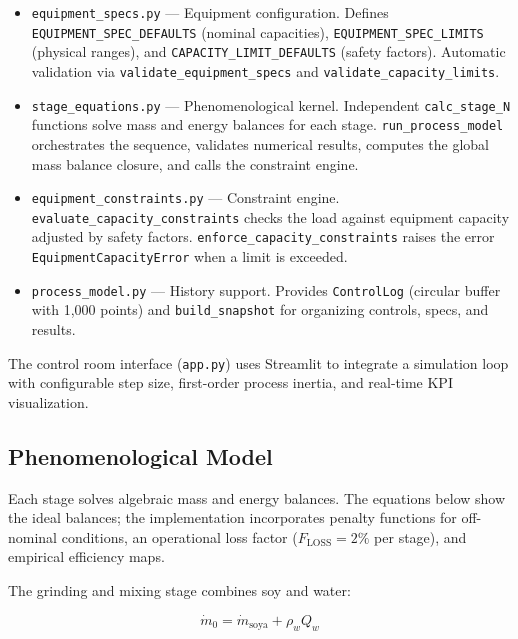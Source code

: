 \documentclass[10pt]{article}
\begin{document}
\begin{itemize}
    \item \texttt{equipment\_}\allowbreak\texttt{specs.py} --- Equipment configuration. Defines \texttt{EQUIPMENT\_SPEC\_}\allowbreak\texttt{DEFAULTS} (nominal capacities), \texttt{EQUIPMENT\_SPEC\_}\allowbreak\texttt{LIMITS} (physical ranges), and \texttt{CAPACITY\_LIMIT\_}\allowbreak\texttt{DEFAULTS} (safety factors). Automatic validation via \texttt{validate\_equipment\_}\allowbreak\texttt{specs} and \texttt{validate\_capacity\_}\allowbreak\texttt{limits}.
    \item \texttt{stage\_equations.py} --- Phenomenological kernel. Independent \texttt{calc\_stage\_N} functions solve mass and energy balances for each stage. \texttt{run\_process\_}\allowbreak\texttt{model} orchestrates the sequence, validates numerical results, computes the global mass balance closure, and calls the constraint engine.
    \item \texttt{equipment\_constraints.py} --- Constraint engine. \texttt{evaluate\_capacity\_}\allowbreak\texttt{constraints} checks the load against equipment capacity adjusted by safety factors. \texttt{enforce\_capacity\_}\allowbreak\texttt{constraints} raises the error \texttt{Equipment}\allowbreak\texttt{CapacityError} when a limit is exceeded.
    \item \texttt{process\_model.py} --- History support. Provides \texttt{ControlLog} (circular buffer with 1,000 points) and \texttt{build\_snapshot} for organizing controls, specs, and results.
\end{itemize}

The control room interface (\texttt{app.py}) uses Streamlit to integrate a simulation loop with configurable step size, first-order process inertia, and real-time KPI visualization.

\subsection{Phenomenological Model}

Each stage solves algebraic mass and energy balances. The equations below show the ideal balances; the implementation incorporates penalty functions for off-nominal conditions, an operational loss factor ($F_{\text{LOSS}}=2\%$ per stage), and empirical efficiency maps.

The grinding and mixing stage combines soy and water:

\begin{equation}
\dot{m}_{0} = \dot{m}_{\text{soya}} + \rho_w Q_w \label{eq:stage0}
\end{equation}
\end{document}
